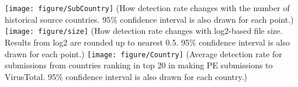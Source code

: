 \begin{figure*}[!htb]
  \texttt{[image: figure/SubCountry]}
{\footnotesize{(How detection rate changes with the number of historical source countries.
95\% confidence interval is also drawn for each point.)}}
\endminipage\hfill
{}
  \texttt{[image: figure/size]}
  {\footnotesize{(How detection rate changes with log2-based file size.
Results from log2 are rounded up to nearest 0.5.
95\% confidence interval is also drawn for each point.)}}
\endminipage\hfill
{}%
  \texttt{[image: figure/Country]}
{\footnotesize{(Average detection rate for submissions from countries ranking 
in top 20 in making PE submissions to VirusTotal. 
95\% confidence interval is also drawn for each country.)}}
\endminipage\hfill

\end{figure*}